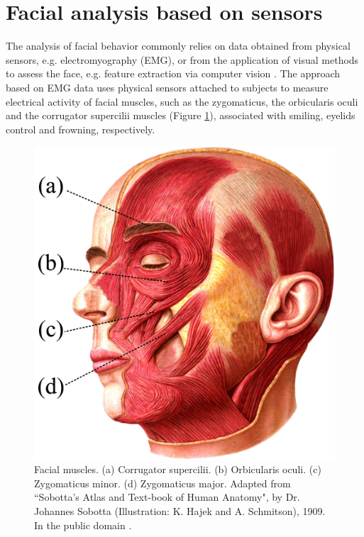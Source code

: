 \section{Facial analysis based on sensors}

The analysis of facial behavior commonly relies on data obtained from physical sensors, e.g. electromyography (EMG), or from the application of visual methods to assess the face, e.g. feature extraction via computer vision \parencite{schrader2017rising}. The approach based on EMG data uses physical sensors attached to subjects to measure electrical activity of facial muscles, such as the zygomaticus, the orbicularis oculi and the corrugator supercilii muscles (Figure \ref{fig:face-muscles}), associated with smiling, eyelids control and frowning, respectively.

\begin{figure}
\centering
\includegraphics[width=1.0\textwidth]{figures/face-muscles.jpg}
\caption{Facial muscles. (a) Corrugator supercilii. (b) Orbicularis oculi. (c) Zygomaticus minor. (d) Zygomaticus major. Adapted from ``Sobotta's Atlas and Text-book of Human Anatomy", by Dr. Johannes Sobotta (Illustration: K. Hajek and A. Schmitson), 1909. In the public domain \parencite{sobotta1909wikimedia}.}
\label{fig:face-muscles}
\end{figure}

